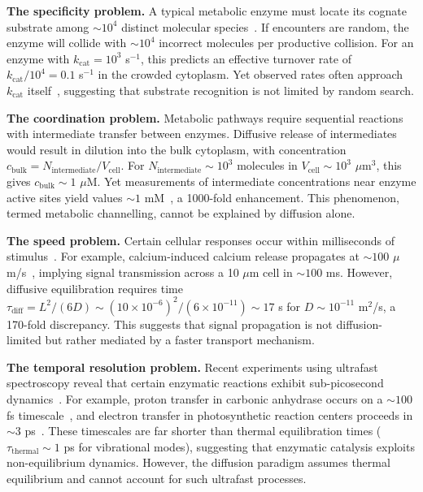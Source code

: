 \documentclass[twocolumn,10pt,aps,prd,superscriptaddress,floatfix,nofootinbib]{revtex4-2}
\theoremstyle{remark}
\begin{document}
\textbf{The specificity problem.} A typical metabolic enzyme must locate its cognate substrate among $\sim 10^{4}$ distinct molecular species~\cite{Alberts2015}. If encounters are random, the enzyme will collide with $\sim 10^{4}$ incorrect molecules per productive collision. For an enzyme with $k_{\mathrm{cat}} = 10^{3}$ s$^{-1}$, this predicts an effective turnover rate of $k_{\mathrm{cat}}/10^{4} = 0.1$ s$^{-1}$ in the crowded cytoplasm. Yet observed rates often approach $k_{\mathrm{cat}}$ itself~\cite{Sweetlove2018}, suggesting that substrate recognition is not limited by random search.

\textbf{The coordination problem.} Metabolic pathways require sequential reactions with intermediate transfer between enzymes. Diffusive release of intermediates would result in dilution into the bulk cytoplasm, with concentration $c_{\mathrm{bulk}} = N_{\mathrm{intermediate}}/V_{\mathrm{cell}}$. For $N_{\mathrm{intermediate}} \sim 10^{3}$ molecules in $V_{\mathrm{cell}} \sim 10^{3}$ $\mu$m$^3$, this gives $c_{\mathrm{bulk}} \sim 1$ $\mu$M. Yet measurements of intermediate concentrations near enzyme active sites yield values $\sim 1$ mM~\cite{Bauler2010}, a 1000-fold enhancement. This phenomenon, termed metabolic channelling, cannot be explained by diffusion alone.

\textbf{The speed problem.} Certain cellular responses occur within milliseconds of stimulus~\cite{Bhalla1999}. For example, calcium-induced calcium release propagates at $\sim 100$ $\mu$m/s~\cite{Berridge1998}, implying signal transmission across a 10 $\mu$m cell in $\sim 100$ ms. However, diffusive equilibration requires time $\tau_{\mathrm{diff}} = L^2/(6D) \sim (10 \times 10^{-6})^2/(6 \times 10^{-11}) \sim 17$ s for $D \sim 10^{-11}$ m$^2$/s, a 170-fold discrepancy. This suggests that signal propagation is not diffusion-limited but rather mediated by a faster transport mechanism.

\textbf{The temporal resolution problem.} Recent experiments using ultrafast spectroscopy reveal that certain enzymatic reactions exhibit sub-picosecond dynamics~\cite{Hammes-Schiffer2006}. For example, proton transfer in carbonic anhydrase occurs on a $\sim 100$ fs timescale~\cite{Voth2006}, and electron transfer in photosynthetic reaction centers proceeds in $\sim 3$ ps~\cite{Zinth1993}. These timescales are far shorter than thermal equilibration times ($\tau_{\mathrm{thermal}} \sim 1$ ps for vibrational modes), suggesting that enzymatic catalysis exploits non-equilibrium dynamics. However, the diffusion paradigm assumes thermal equilibrium and cannot account for such ultrafast processes.
\end{document}
